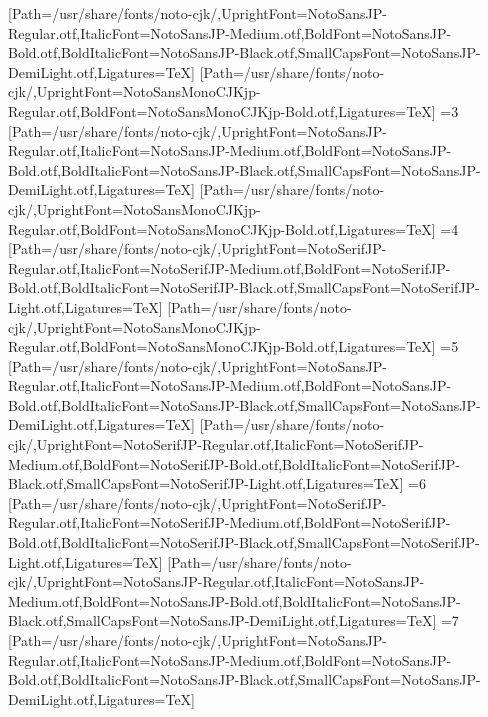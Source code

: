 [Path=/usr/share/fonts/noto-cjk/,UprightFont=NotoSansJP-Regular.otf,ItalicFont=NotoSansJP-Medium.otf,BoldFont=NotoSansJP-Bold.otf,BoldItalicFont=NotoSansJP-Black.otf,SmallCapsFont=NotoSansJP-DemiLight.otf,Ligatures=TeX]
[Path=/usr/share/fonts/noto-cjk/,UprightFont=NotoSansMonoCJKjp-Regular.otf,BoldFont=NotoSansMonoCJKjp-Bold.otf,Ligatures=TeX]
\else\ifnum\value{CJKFonts}=3
[Path=/usr/share/fonts/noto-cjk/,UprightFont=NotoSansJP-Regular.otf,ItalicFont=NotoSansJP-Medium.otf,BoldFont=NotoSansJP-Bold.otf,BoldItalicFont=NotoSansJP-Black.otf,SmallCapsFont=NotoSansJP-DemiLight.otf,Ligatures=TeX]
[Path=/usr/share/fonts/noto-cjk/,UprightFont=NotoSansMonoCJKjp-Regular.otf,BoldFont=NotoSansMonoCJKjp-Bold.otf,Ligatures=TeX]
\else\ifnum\value{CJKFonts}=4
[Path=/usr/share/fonts/noto-cjk/,UprightFont=NotoSerifJP-Regular.otf,ItalicFont=NotoSerifJP-Medium.otf,BoldFont=NotoSerifJP-Bold.otf,BoldItalicFont=NotoSerifJP-Black.otf,SmallCapsFont=NotoSerifJP-Light.otf,Ligatures=TeX]
[Path=/usr/share/fonts/noto-cjk/,UprightFont=NotoSansMonoCJKjp-Regular.otf,BoldFont=NotoSansMonoCJKjp-Bold.otf,Ligatures=TeX]
\else\ifnum\value{CJKFonts}=5
[Path=/usr/share/fonts/noto-cjk/,UprightFont=NotoSansJP-Regular.otf,ItalicFont=NotoSansJP-Medium.otf,BoldFont=NotoSansJP-Bold.otf,BoldItalicFont=NotoSansJP-Black.otf,SmallCapsFont=NotoSansJP-DemiLight.otf,Ligatures=TeX]
[Path=/usr/share/fonts/noto-cjk/,UprightFont=NotoSerifJP-Regular.otf,ItalicFont=NotoSerifJP-Medium.otf,BoldFont=NotoSerifJP-Bold.otf,BoldItalicFont=NotoSerifJP-Black.otf,SmallCapsFont=NotoSerifJP-Light.otf,Ligatures=TeX]
\else\ifnum\value{CJKFonts}=6
[Path=/usr/share/fonts/noto-cjk/,UprightFont=NotoSerifJP-Regular.otf,ItalicFont=NotoSerifJP-Medium.otf,BoldFont=NotoSerifJP-Bold.otf,BoldItalicFont=NotoSerifJP-Black.otf,SmallCapsFont=NotoSerifJP-Light.otf,Ligatures=TeX]
[Path=/usr/share/fonts/noto-cjk/,UprightFont=NotoSansJP-Regular.otf,ItalicFont=NotoSansJP-Medium.otf,BoldFont=NotoSansJP-Bold.otf,BoldItalicFont=NotoSansJP-Black.otf,SmallCapsFont=NotoSansJP-DemiLight.otf,Ligatures=TeX]
\else\ifnum\value{CJKFonts}=7
[Path=/usr/share/fonts/noto-cjk/,UprightFont=NotoSansJP-Regular.otf,ItalicFont=NotoSansJP-Medium.otf,BoldFont=NotoSansJP-Bold.otf,BoldItalicFont=NotoSansJP-Black.otf,SmallCapsFont=NotoSansJP-DemiLight.otf,Ligatures=TeX]
